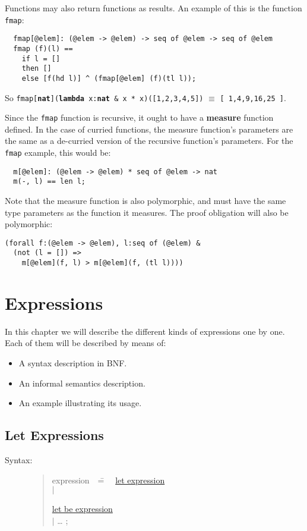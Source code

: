\documentclass{overturerepchap}
\newcommand{\Rule}[2]{
  \begin{quote}\begin{tabbing}
    #1\index{#1}\ \ \= = \ \ \= #2  ; %

  \end{tabbing}\end{quote}
  }
\newcommand{\Ruleref}[1]{
  \hyperlink{rule:#1}{#1}}
\newcommand{\dsep}{\\ \> $|$ \>}
\newcommand{\keyw}[1]{{\bf\ttfamily #1}}
\begin{document}
{\vspace{1ex}
Functions may also return functions as results. An example of this is
the function \texttt{fmap}:
\begin{lstlisting}
  fmap[@elem]: (@elem -> @elem) -> seq of @elem -> seq of @elem
  fmap (f)(l) ==
    if l = []
    then []
    else [f(hd l)] ^ (fmap[@elem] (f)(tl l));
\end{lstlisting}
So \texttt{fmap[\keyw{nat}](\keyw{lambda} x:\keyw{nat} \& x * x)([1,2,3,4,5])} $\equiv$
\texttt{[ 1,4,9,16,25 ]}.

\vspace{1ex}
\noindent Since the \texttt{fmap} function is recursive, it ought to have a \keyw{measure}
function defined. In the case of curried functions, the measure function's parameters
are the same as a de-curried version of the recursive function's parameters. For
the \texttt{fmap} example, this would be:
\begin{lstlisting}
  m[@elem]: (@elem -> @elem) * seq of @elem -> nat
  m(-, l) == len l;
\end{lstlisting}
Note that the measure function is also polymorphic, and must have the same type
parameters as the function it measures. The proof obligation will also be polymorphic:
\begin{lstlisting}
(forall f:(@elem -> @elem), l:seq of (@elem) &
  (not (l = []) =>
    m[@elem](f, l) > m[@elem](f, (tl l))))
\end{lstlisting}

\chapter{Expressions}\label{chap:expr}

In this chapter we will describe the different kinds of expressions
one by one. Each of them will be described by means of:
\begin{itemize}
\item A syntax description in BNF.
\item An informal semantics description.
\item An example illustrating its usage.
\end{itemize}

\section{Let Expressions}\label{let-exp}

\begin{description}
\item[Syntax:]
  \Rule{expression}{
    \Ruleref{let expression} \dsep
    \Ruleref{let be expression} \dsep
    \ldots
    }


\end{description}}
\end{document}
